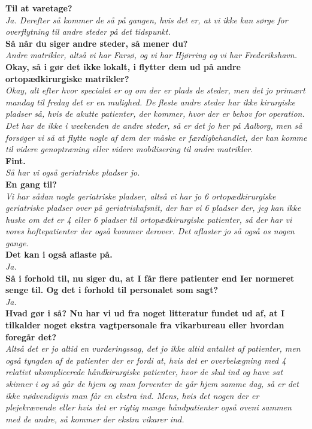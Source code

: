 \noindent
\textbf{Til at varetage?} \\
\noindent
\textit{Ja. Derefter så kommer de så på gangen, hvis det er, at vi ikke kan sørge for overflytning til andre steder på det tidspunkt.} \\
\noindent
\textbf{Så når du siger andre steder, så mener du?} \\
\noindent
\textit{Andre matrikler, altså vi har Farsø, og vi har Hjørring og vi har Frederikshavn.} \\
\noindent
\textbf{Okay, så i gør det ikke lokalt, i flytter dem ud på andre ortopædkirurgiske matrikler?} \\
\noindent
\textit{Okay, alt efter hvor specialet er og om der er plads de steder, men det jo primært mandag til fredag det er en mulighed. De fleste andre steder har ikke kirurgiske pladser så, hvis de akutte patienter, der kommer, hvor der er behov for operation. Det har de ikke i weekenden de andre steder, så er det jo her på Aalborg, men så forsøger vi så at flytte nogle af dem der måske er færdigbehandlet, der kan komme til videre genoptræning eller videre mobilisering til andre matrikler. } \\
\noindent
\textbf{Fint.} \\
\noindent
\textit{Så har vi også geriatriske pladser jo.} \\
\noindent
\textbf{En gang til?} \\
\noindent
\textit{Vi har sådan nogle geriatriske pladser, altså vi har jo 6 ortopædkirurgiske geriatriske pladser over på geriatriskafsnit, der har vi 6 pladser der, jeg kan ikke huske om det er 4 eller 6 pladser til ortopædkirurgiske patienter, så der har vi vores hoftepatienter der også kommer derover. Det aflaster jo så også os nogen gange.} \\
\noindent
\textbf{Det kan i også aflaste på.} \\
\noindent
\textit{Ja.} \\
\noindent
\textbf{Så i forhold til, nu siger du, at I får flere patienter end Ier normeret senge til. Og det i forhold til personalet som sagt?} \\
\noindent
\textit{Ja.} \\
\noindent
\textbf{Hvad gør i så? Nu har vi ud fra noget litteratur fundet ud af, at I tilkalder noget ekstra vagtpersonale fra vikarbureau eller hvordan foregår det? } \\
\noindent
\textit{Altså det er jo altid en vurderingssag, det jo ikke altid antallet af patienter, men også tyngden af de patienter der er fordi at, hvis det er overbelægning med 4 relativt ukomplicerede håndkirurgiske patienter, hvor de skal ind og have sat skinner i og så går de hjem og man forventer de går hjem samme dag, så er det ikke nødvendigvis man får en ekstra ind. Mens, hvis det nogen der er plejekrævende eller hvis det er rigtig mange håndpatienter også oveni sammen med de andre, så kommer der ekstra vikarer ind. }\\
